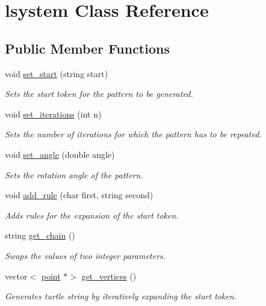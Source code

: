 \hypertarget{classlsystem}{}\section{lsystem Class Reference}
\label{classlsystem}
\subsection*{Public Member Functions}
\begin{DoxyCompactItemize}
\item 
void \hyperlink{classlsystem_acaa745c30cefc50f8e26655faf915e4c}{set\+\_\+start} (string start)
\begin{DoxyCompactList}\small\item\em Sets the start token for the pattern to be generated. \end{DoxyCompactList}\item 
void \hyperlink{classlsystem_ad66281259d2c5aab49d499b590a1ef7e}{set\+\_\+iterations} (int n)
\begin{DoxyCompactList}\small\item\em Sets the number of iterations for which the pattern has to be repeated. \end{DoxyCompactList}\item 
void \hyperlink{classlsystem_ae1812b8d332ba6e9e7593f5a39a28945}{set\+\_\+angle} (double angle)
\begin{DoxyCompactList}\small\item\em Sets the rotation angle of the pattern. \end{DoxyCompactList}\item 
void \hyperlink{classlsystem_aa60f79a8eb02695cd94a9ba287c4bbda}{add\+\_\+rule} (char first, string second)
\begin{DoxyCompactList}\small\item\em Adds rules for the expansion of the start token. \end{DoxyCompactList}\item 
string \hyperlink{classlsystem_a1cb69fe5e7d47bb6eafb397dd9640571}{get\+\_\+chain} ()
\begin{DoxyCompactList}\small\item\em Swaps the values of two integer parameters. \end{DoxyCompactList}\item 
vector$<$ \hyperlink{classpoint}{point} $\ast$$>$ \hyperlink{classlsystem_a21ea351c7dde6c0f7e708f2a2f341688}{get\+\_\+vertices} ()
\begin{DoxyCompactList}\small\item\em Generates turtle string by iteratively expanding the start token. \end{DoxyCompactList}\item 
$$
\end{DoxyCompactItemize}
